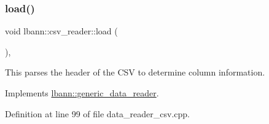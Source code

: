 \subsubsection{\texorpdfstring{load()}{load()}}
{\footnotesize\ttfamily void lbann\+::csv\+\_\+reader\+::load (\begin{DoxyParamCaption}{ }\end{DoxyParamCaption})\hspace{0.3cm}{\ttfamily [override]}, {\ttfamily [virtual]}}

This parses the header of the C\+SV to determine column information. 

Implements \hyperlink{classlbann_1_1generic__data__reader_afeb47703d988a230a59859cbfc178215}{lbann\+::generic\+\_\+data\+\_\+reader}.



Definition at line 99 of file data\+\_\+reader\+\_\+csv.\+cpp.


